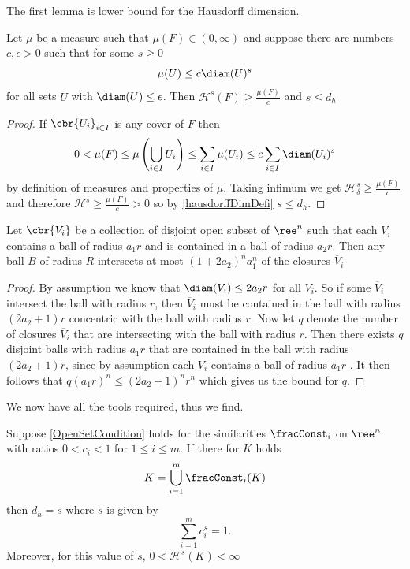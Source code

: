 The first lemma is lower bound for the Hausdorff dimension.
\begin{lemma}\label{massDistribution}
	Let $\mu$ be a measure such that $\mu(F) \in (0, \infty)$ and suppose there are numbers $c, \epsilon > 0$ such that for some $s \geq 0$
	\begin{equation}
		\mu(U) \leq c \diam(U)^{s}
	\end{equation}
	for all sets $U$ with $\diam(U) \leq \epsilon$. Then $\mathcal{H}^{s}(F) \geq \frac{\mu(F)}{c}$ and $s \leq d_h$
\end{lemma}
\begin{proof}
	If $\cbr{U_i}_{i \in I}$ is any cover of $F$ then
	\begin{equation}
		0 < \mu(F) \leq \mu \left(\bigcup_{i \in I} U_i\right) \leq \sum_{i \in I} \mu(U_i) \leq c \sum_{i \in I} \diam(U_i)^{s}
	\end{equation}
	by definition of measures and properties of $\mu$. Taking infimum we get $\mathcal{H}^{s}_{\delta} \geq \frac{\mu(F)}{c}$ and therefore $\mathcal{H}^{s} \geq \frac{\mu(F)}{c} > 0$ so by \cref{hausdorffDimDefi} $s \leq d_h$.
\end{proof}

\begin{lemma}\label{theConstq}
	Let $\cbr{V_i}$ be a collection of disjoint open subset of $\ree^{n}$ such that each $V_i$ contains a ball of radius $a_1r$ and is contained in a ball of radius $a_2r$. Then any ball $B$ of radius $R$ intersects at most $(1+2a_2)^{n}a_{1}^{n}$ of the closures $\overline{V}_i$
\end{lemma}
\begin{proof}
	By assumption we know that $\diam(V_i) \leq 2a_2 r$ for all $V_i$. So if some $\overline{V}_i$ intersect the ball with radius $r$, then $\overline{V}_i$ must be contained in the ball with radius $(2a_2 + 1)r$ concentric with the ball with radius $r$.  Now let $q$ denote the number of closures $\overline{V}_i$ that are intersecting with the ball with radius $r$. Then there exists $q$ disjoint balls with radius $a_1r$ that are contained in the ball with radius $(2a_2 +1)r$, since by assumption each $\overline{V}_i$ contains a ball of radius $a_1r$ . It then follows that $q(a_1r)^{n} \leq (2a_2 +1)^{n}r^{n}$ which gives us the bound for $q$.
\end{proof}

We now have all the tools required, thus we find.
\begin{theorem}\label{HausdorffDimTheorem}
	Suppose \cref{OpenSetCondition} holds for the similarities $\fracConst_i$ on $\ree^{n}$ with ratios $0 < c_i < 1$ for $1 \leq i \leq m$. If there for $K$ holds
	\begin{equation}\label{hausDorffDimCondition}
		K = \bigcup_{i = 1}^{m} \fracConst_i(K)
	\end{equation}
	then $d_h = s$ where $s$ is given by
	\begin{equation}\label{hausDorffDimRatioSum}
		\sum_{i = 1}^{m} c_i^{s} = 1.
	\end{equation}
	Moreover, for this value of $s$, $0 < \mathcal{H}^s(K) < \infty$
\end{theorem}

